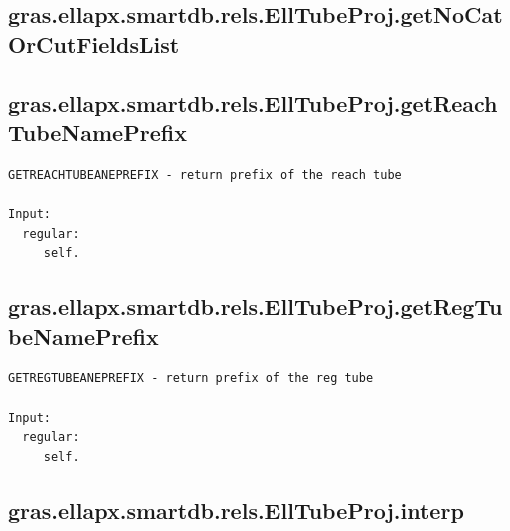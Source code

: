 \documentclass[letterpaper,10pt,english]{sphinxmanual}
\begin{document}
\subsection{gras.ellapx.smartdb.rels.EllTubeProj.getNoCatOrCutFieldsList}
\label{chap_functions:gras-ellapx-smartdb-rels-elltubeproj-getnocatorcutfieldslist}

\subsection{gras.ellapx.smartdb.rels.EllTubeProj.getReachTubeNamePrefix}
\label{chap_functions:gras-ellapx-smartdb-rels-elltubeproj-getreachtubenameprefix}
\begin{Verbatim}[commandchars=\\\{\}]
GETREACHTUBEANEPREFIX - return prefix of the reach tube

Input:
  regular:
     self.
\end{Verbatim}


\subsection{gras.ellapx.smartdb.rels.EllTubeProj.getRegTubeNamePrefix}
\label{chap_functions:gras-ellapx-smartdb-rels-elltubeproj-getregtubenameprefix}
\begin{Verbatim}[commandchars=\\\{\}]
GETREGTUBEANEPREFIX - return prefix of the reg tube

Input:
  regular:
     self.
\end{Verbatim}


\subsection{gras.ellapx.smartdb.rels.EllTubeProj.interp}
\label{chap_functions:gras-ellapx-smartdb-rels-elltubeproj-interp}
\end{document}
